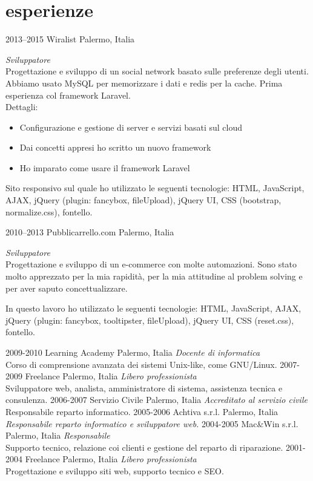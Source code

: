 \documentclass[]{friggeri-cv} %
\begin{document}
\section{esperienze}
\begin{entrylist}
\entry
{2013--2015}
{Wiralist}
{Palermo, Italia}
{\emph{Sviluppatore} \\
Progettazione e sviluppo di un social network basato sulle preferenze degli utenti. Abbiamo usato MySQL per memorizzare i dati e redis per la cache. Prima esperienza col framework Laravel. \\
Dettagli:
\begin{itemize}
\item Configurazione e gestione di server e servizi basati sul cloud
\item Dai concetti appresi ho scritto un nuovo framework
\item Ho imparato come usare il framework Laravel
\end{itemize}

Sito responsivo sul quale ho utilizzato le seguenti tecnologie: HTML,
JavaScript, AJAX, jQuery (plugin: fancybox, fileUpload), jQuery UI,
CSS (bootstrap, normalize.css), fontello.
}
\entry
{2010--2013}
{Pubblicarrello.com}
{Palermo, Italia}
{\emph{Sviluppatore} \\
Progettazione e sviluppo di un e-commerce con molte automazioni. Sono stato molto
apprezzato per la mia rapidità, per la mia attitudine al problem solving e per
aver saputo concettualizzare.

In questo lavoro ho utilizzato le seguenti tecnologie: HTML,
JavaScript, AJAX, jQuery (plugin: fancybox, tooltipster, fileUpload),
jQuery UI, CSS (reset.css), fontello.
}
\entry
{2009-2010}
{Learning Academy}
{Palermo, Italia}
{\emph{Docente di informatica} \\
Corso di comprensione avanzata dei sistemi Unix-like, come GNU/Linux.
}
\entry
{2007-2009}
{Freelance}
{Palermo, Italia}
{\emph{Libero professionista} \\
Sviluppatore web, analista, amministratore di sistema, assistenza tecnica e consulenza.
}
\entry
{2006-2007}
{Servizio Civile}
{Palermo, Italia}
{\emph{Accreditato al servizio civile} \\
Responsabile reparto informatico.
}
\entry
{2005-2006}
{Achtiva s.r.l.}
{Palermo, Italia}
{\emph{Responsabile reparto informatico e sviluppatore web.} }
\entry
{2004-2005}
{Mac\&Win s.r.l.}
{Palermo, Italia}
{\emph{Responsabile} \\
Supporto tecnico, relazione coi clienti e gestione del reparto di riparazione.
}
\entry
{2001-2004}
{Freelance}
{Palermo, Italia}
{\emph{Libero professionista} \\
Progettazione e sviluppo siti web, supporto tecnico e SEO.
}
\end{entrylist}
\end{document}
